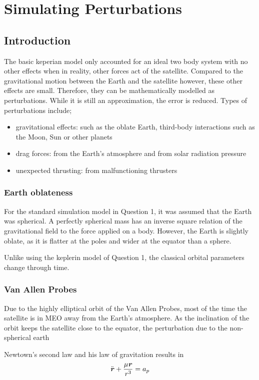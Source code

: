 \documentclass[Space3_Assign1.tex]{subfiles}
\begin{document}
\newpage
\section{Simulating Perturbations}

\subsection{Introduction}
The basic keperian model only accounted for an ideal two body system with no other effects when in reality, other forces act of the satellite. Compared to the gravitational motion between the Earth and the satellite however, these other effects are small. Therefore, they can be mathematically modelled as perturbations. While it is still an approximation, the error is reduced. Types of perturbations include;
\begin{itemize}
\item gravitational effects: such as the oblate Earth, third-body interactions such as the Moon, Sun or other planets
\item drag forces: from the Earth's atmosphere and from solar radiation pressure
\item unexpected thrusting: from malfunctioning thrusters
\end{itemize} 


\subsubsection{Earth oblateness}
For the standard simulation model in Question 1, it was assumed that the Earth was spherical. A perfectly spherical mass has an inverse square relation of the gravitational field to the force applied on a body. However, the Earth is slightly oblate, as it is flatter at the poles and wider at the equator than a sphere. 

Unlike using the keplerin model of Question 1, the classical orbital parameters change through time.

\subsubsection{Van Allen Probes}
Due to the highly elliptical orbit of the Van Allen Probes, most of the time the satellite is in MEO away from the Earth's atmosphere. As the inclination of the orbit keeps the satellite close to the equator, the perturbation due to the non-spherical earth 

Newtown's second law and his law of gravitation results in 
\begin{eqnarray}
\ddot{\textbf{\textit{r}}}+\frac{\mu\textbf{\textit{r}}}{r^3} = a_p
\end{eqnarray}
\end{document}
